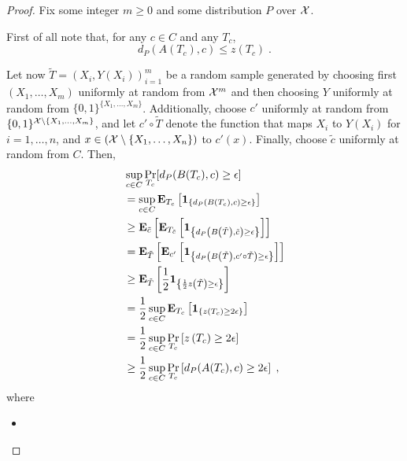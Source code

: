 \begin{proof}
Fix some integer $m \geq 0$ and some distribution $P$ over $\mathcal{X}$.

First of all note that, 
for any $c \in C$ and any $T_c$,
\begin{equation}
\label{eq: relate dP(A,c) to z(Tc)}
	d_P(A(T_{c}),c) \leq z(T_c)
	\;.
\end{equation}

Let now $\tilde{T} = (X_i,Y(X_i))_{i=1}^m$ be a random sample generated by choosing first $(X_1, \dots, X_m)$ uniformly at random from $\mathcal{X}^m$ and then choosing $Y$ uniformly at random from $\{0,1\}^{\{X_1, \dots, X_m\}}$.
Additionally, choose $c'$ uniformly at random from $\{0,1\}^{\mathcal{X} \setminus \{X_1, \dots, X_m\}}$, and let $c' \circ \tilde{T}$ denote the function that maps $X_i$ to $Y(X_i)$ for $i=1,\dots,n$, and $x \in (\mathcal{X} \setminus \{X_1, \dots, X_n\})$ to $c'(x)$.
Finally, choose $\tilde{c}$ uniformly at random from $C$.
Then,
\begin{align}
	&
	\sup_{c \in C}\Pr_{T_c}[d_P(B(T_c),c) \geq \epsilon] 
	\notag\\
	&=
	\sup_{c \in C}\operatorname{\mathbf{E}}_{T_c}\left[ 
		\mathbf{1}_{\left\{ d_P\left(B\left( T_c\right),c \right) \geq \epsilon \right\}}
	\right] 
	\notag\\
	&\geq \operatorname{\mathbf{E}}_{\tilde{c}}\left[
		\operatorname{\mathbf{E}}_{T_{\tilde{c}}}\left[ 
			\mathbf{1}_{\left\{d_P\left(B\left( \tilde{T}\right),\tilde{c} \right) \geq \epsilon \right\}}
		\right]
	\right]
	\notag\\
	&= \operatorname{\mathbf{E}}_{\tilde{T}} \left[
		\operatorname{\mathbf{E}}_{c'} \left[
			\mathbf{1}_{\left\{d_P\left(B\left( \tilde{T}\right),c'\circ \tilde{T} \right) \geq \epsilon \right\}}
		\right] 
	\right]
	\notag\\
	&\geq \operatorname{\mathbf{E}}_{\tilde{T}} \left[
		\frac{1}{2} \mathbf 1_{\left\{ \frac{1}{2}z\left( \tilde{T} \right) \geq \epsilon \right\}}
	\right]
	\label{eq: switch to 2epsilon}
	\\
	&= \frac{1}{2}\sup_{c \in C}\operatorname{\mathbf{E}}_{T_c} \left[
		\mathbf 1_{\left\{ z\left( T_c \right) \geq 2\epsilon \right\}}
	\right]
	\label{eq: switch back to sup}
	\\
	&= \frac{1}{2}\sup_{c \in C}\Pr_{T_c} \left[
		z\left( T_c \right) \geq 2\epsilon
	\right]
	\notag
	\\
	&\geq \frac{1}{2}\sup_{c \in C}\Pr_{T_c} \left[
		d_P(A(T_c) , c) \geq 2\epsilon
	\right]
	\label{eq: use the relation of d(A(T),c) and z(T)}
	 \;,
\end{align}
where
\begin{itemize}
\item 

\end{itemize}
\end{proof}
